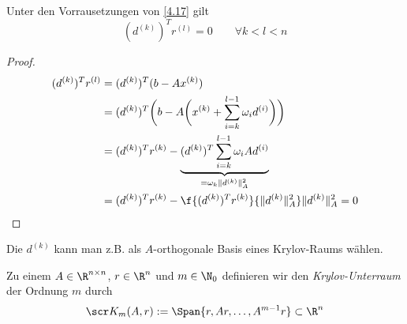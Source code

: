 \documentclass[11pt]{scrartcl}
\begin{document}
\begin{lem}[Orthogonalität] \label{4.18}
	Unter den Vorrausetzungen von \ref{4.17} gilt
	\[
		(d^{(k)})^T r^{(l)} = 0
		\qquad \forall k < l < n
	\]
	\begin{proof}
		\begin{align*}
			(d^{(k)})^T r^{(l)}
			&= (d^{(k)})^T (b-Ax^{(k)}) \\
			&= (d^{(k)})^T \bigg( b - A \bigg(x^{(k)} + \sum_{i=k}^{l-1} \omega_i d^{(i)} \bigg) \bigg) \\
			&= (d^{(k)})^T r^{(k)} - \underbrace{(d^{(k)})^T \sum_{i=k}^{l-1} \omega_i A d^{(i)}}_{= \omega_k \|d^{(k)}\|_A^2} \\
			&= (d^{(k)})^T r^{(k)} - \f{(d^{(k)})^T r^{(k)}}{\|d^{(k)}\|_A^2} \|d^{(k)}\|_A^2 = 0
		\end{align*}
	\end{proof}
\end{lem}

Die $d^{(k)}$ kann man z.B. als $A$-orthogonale Basis eines Krylov-Raums wählen.

\begin{df} \label{4.19}
	Zu einem $A \in \R^{n\times n}$, $r\in \R^n$ und $m\in \N_0$ definieren wir den \emph{Krylov-Unterraum} der Ordnung $m$  durch
	\[
		\scr K_m(A, r) := \Span\{ r, Ar, \dotsc, A^{m-1}r \} \subset \R^n
	\]
\end{df}
\end{document}
